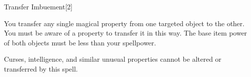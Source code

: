 \begin{spellsection}{Transfer Imbuement}[2]
    \begin{spellheader}
    \end{spellheader}
    \begin{spellcontent}
        \begin{spelltargetinginfo}
        \end{spelltargetinginfo}
        \begin{spelleffects}
            \spelleffect You transfer any single magical property from one targeted object to the other.
            You must be aware of a property to transfer it in this way.
            The base item power of both objects must be less than your spellpower.

            Curses, intelligence, and similar unusual properties cannot be altered or transferred by this spell.
        \end{spelleffects}
    \end{spellcontent}
    \begin{spellfooter}
        \miscastexplode
    \end{spellfooter}
    \begin{spellaugments}
    \end{spellaugments}
\end{spellsection}

